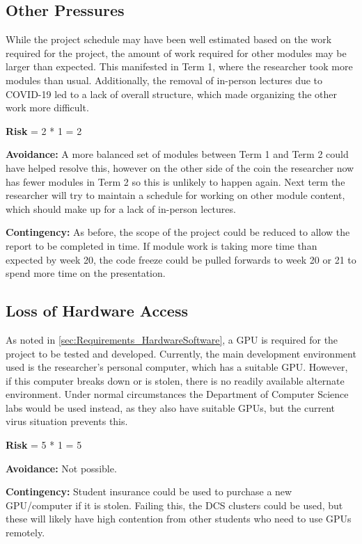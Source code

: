 \subsection{Other Pressures}
While the project schedule may have been well estimated based on the work required for the project, the amount of work required for other modules may be larger than expected.
This manifested in Term 1, where the researcher took more modules than usual. 
Additionally, the removal of in-person lectures due to COVID-19 led to a lack of overall structure, which made organizing the other work more difficult.

\textbf{Risk} = 2 * 1 = 2

\textbf{Avoidance:}
A more balanced set of modules between Term 1 and Term 2 could have helped resolve this, however on the other side of the coin the researcher now has fewer modules in Term 2 so this is unlikely to happen again.
Next term the researcher will try to maintain a schedule for working on other module content, which should make up for a lack of in-person lectures.

\textbf{Contingency:}
As before, the scope of the project could be reduced to allow the report to be completed in time.
If module work is taking more time than expected by week 20, the code freeze could be pulled forwards to week 20 or 21 to spend more time on the presentation.


\subsection{Loss of Hardware Access}
As noted in \cref{sec:Requirements_HardwareSoftware}, a GPU is required for the project to be tested and developed.
Currently, the main development environment used is the researcher's personal computer, which has a suitable GPU.
However, if this computer breaks down or is stolen, there is no readily available alternate environment.
Under normal circumstances the Department of Computer Science labs would be used instead, as they also have suitable GPUs, but the current virus situation prevents this.

\textbf{Risk} = 5 * 1 = 5

\textbf{Avoidance:}
Not possible.

\textbf{Contingency:}
Student insurance could be used to purchase a new GPU/computer if it is stolen.
Failing this, the DCS clusters could be used, but these will likely have high contention from other students who need to use GPUs remotely.

